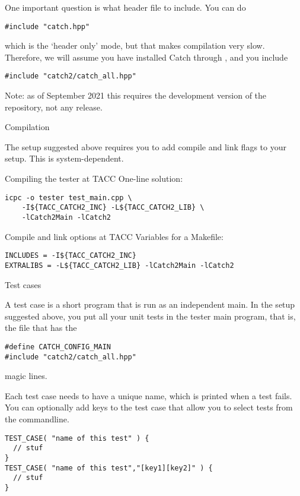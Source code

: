 One important question is what header file to include.
You can do 
\begin{lstlisting}
#include "catch.hpp"
\end{lstlisting}
which is the `header only' mode,
but that makes compilation very slow.
Therefore, we will assume you have installed Catch through ,
and you include
\begin{lstlisting}
#include "catch2/catch_all.hpp"
\end{lstlisting}
Note: as of September 2021 this requires the development version of the repository,
not any  release.

 {Compilation}

The setup suggested above requires you to add compile and link flags to your setup.
This is system-dependent.

\begin{tacc}
\begin{block}{Compiling the tester at TACC}
\label{sl:catch-compile}
One-line solution:
\begin{verbatim}
icpc -o tester test_main.cpp \
    -I${TACC_CATCH2_INC} -L${TACC_CATCH2_LIB} \
    -lCatch2Main -lCatch2
\end{verbatim}
\end{block}
\begin{block}{Compile and link options at TACC}
\label{sl:catch-compile-options}
Variables for a Makefile:
\begin{verbatim}
INCLUDES = -I${TACC_CATCH2_INC}
EXTRALIBS = -L${TACC_CATCH2_LIB} -lCatch2Main -lCatch2
\end{verbatim}
\end{block}
\end{tacc}

 {Test cases}

A test case is a short program that is run as an independent main.
In the setup suggested above, you put all your unit tests
in the tester main program, that is,
the file that has the
\begin{lstlisting}
#define CATCH_CONFIG_MAIN
#include "catch2/catch_all.hpp"
\end{lstlisting}
magic lines.

Each test case needs to have a unique name,
which is printed when a test fails.
You can optionally add keys to the test case
that allow you to select tests from the commandline.

\begin{lstlisting}
TEST_CASE( "name of this test" ) {
  // stuf
}
TEST_CASE( "name of this test","[key1][key2]" ) {
  // stuf
}
\end{lstlisting}

